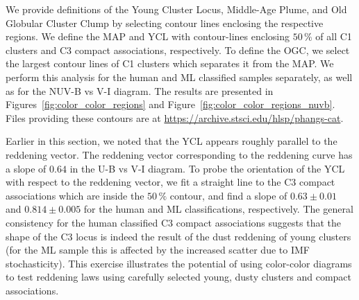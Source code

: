 \documentclass[linenumbers]{aastex63}
\begin{document}
{%

We provide definitions of the Young Cluster Locus, Middle-Age Plume, and Old Globular Cluster Clump by selecting contour lines enclosing the respective regions.
We define the MAP and YCL with contour-lines enclosing $50\,\%$ of all C1 clusters and C3 compact associations, respectively. 
To define the OGC, we select the largest contour lines of C1 clusters which separates it from the MAP. %
We perform this analysis for the human and ML classified samples separately, as well as for the NUV-B vs V-I diagram.  The results are presented in  Figures~\ref{fig:color_color_regions} and Figure~\ref{fig:color_color_regions_nuvb}. %
Files providing these contours are at \url{https://archive.stsci.edu/hlsp/phangs-cat}.

Earlier in this section, we noted that the YCL appears roughly parallel to the reddening vector.
The reddening vector corresponding to the \citet{cardelli_relationship_1989} reddening curve has a slope of $0.64$ in the U-B vs V-I diagram.
To probe the orientation of the YCL with respect to the reddening vector, we fit a straight line to the C3 compact associations which are inside the $50\,\%$ contour, and find a slope of $0.63\pm0.01$ and $0.814\pm0.005$ for the human and ML classifications, respectively. 
The general consistency for the human classified C3 compact associations suggests that the shape of the C3 locus is indeed the result of the dust reddening of young clusters (for the ML sample this is affected by the increased scatter due to IMF stochasticity). %
This exercise illustrates the potential of using color-color diagrams to test reddening laws using carefully selected young, dusty clusters and compact associations. 






}
\end{document}
